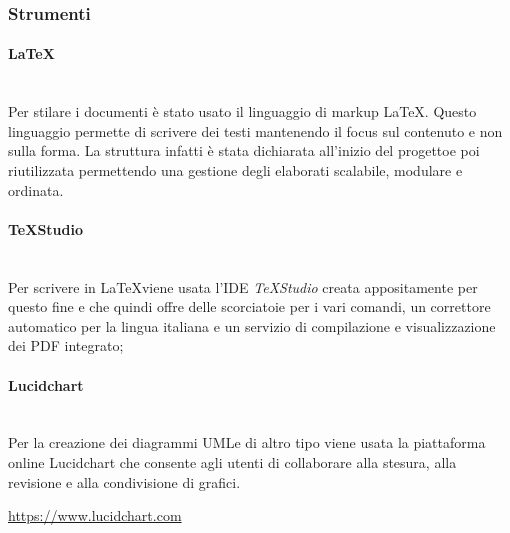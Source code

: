             \subsubsection{Strumenti}
                    \paragraph{\LaTeX}\mbox{}\\ [1mm]
                        Per stilare i documenti è stato usato il linguaggio di markup \LaTeX. Questo linguaggio permette di scrivere dei testi mantenendo il focus
                        sul contenuto e non sulla forma. La struttura infatti è stata dichiarata all'inizio del progetto\glosp e poi riutilizzata permettendo una gestione degli elaborati scalabile, modulare e ordinata.
                    \paragraph{TeXStudio}\mbox{}\\ [1mm]
                        Per scrivere in \LaTeX viene usata l'IDE \textit{TeXStudio} creata appositamente per questo fine e che quindi offre delle scorciatoie
                        per i vari comandi, un correttore automatico per la lingua italiana e un servizio di compilazione e visualizzazione dei PDF integrato;
                    \paragraph{Lucidchart}\mbox{}\\ [1mm]
                        Per la creazione dei diagrammi UML\glosp e di altro tipo viene usata la piattaforma online Lucidchart che consente agli utenti di collaborare alla stesura, alla revisione e alla condivisione di grafici. \newline \newline
                        \centerline{\url{https://www.lucidchart.com}}